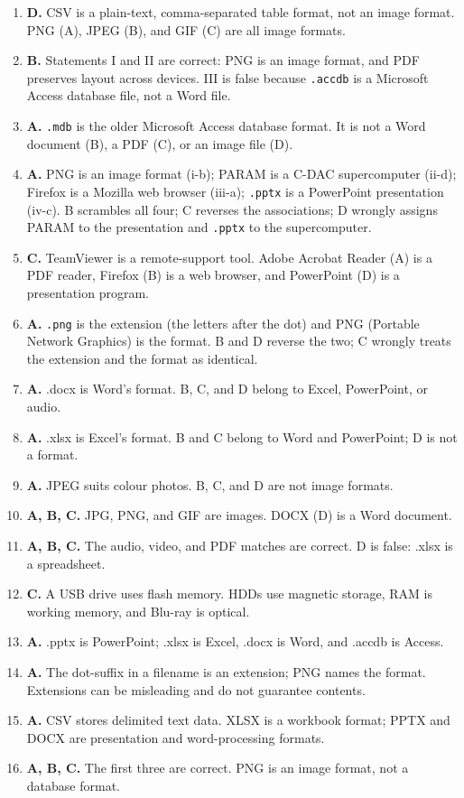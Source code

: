 \begin{enumerate}[label=\textbf{Q\arabic*.}, leftmargin=*]
  separators. It is not a compressed page image (B), a keyed database (C), or
  a formatted document (D).
\item \textbf{D.} CSV is a plain-text, comma-separated table format, not an
  image format. PNG (A), JPEG (B), and GIF (C) are all image formats.
\item \textbf{B.} Statements I and II are correct: PNG is an image format,
  and PDF preserves layout across devices. III is false because
  \texttt{.accdb} is a Microsoft Access database file, not a Word file.
\item \textbf{A.} \texttt{.mdb} is the older Microsoft Access database
  format. It is not a Word document (B), a PDF (C), or an image file (D).
\item \textbf{A.} PNG is an image format (i-b); PARAM is a C-DAC supercomputer
  (ii-d); Firefox is a Mozilla web browser (iii-a); \texttt{.pptx} is a
  PowerPoint presentation (iv-c). B scrambles all four; C reverses the
  associations; D wrongly assigns PARAM to the presentation and
  \texttt{.pptx} to the supercomputer.
\item \textbf{C.} TeamViewer is a remote-support tool. Adobe Acrobat Reader
  (A) is a PDF reader, Firefox (B) is a web browser, and PowerPoint (D) is a
  presentation program.
\item \textbf{A.} \texttt{.png} is the extension (the letters after the dot)
  and PNG (Portable Network Graphics) is the format. B and D reverse the two;
  C wrongly treats the extension and the format as identical.

\item \textbf{A.} .docx is Word's format. B, C, and D belong to Excel, PowerPoint, or audio.
\item \textbf{A.} .xlsx is Excel's format. B and C belong to Word and PowerPoint; D is not a format.
\item \textbf{A.} JPEG suits colour photos. B, C, and D are not image formats.
\item \textbf{A, B, C.} JPG, PNG, and GIF are images. DOCX (D) is a Word document.
\item \textbf{A, B, C.} The audio, video, and PDF matches are correct. D is false: .xlsx is a spreadsheet.
\item \textbf{C.} A USB drive uses flash memory. HDDs use magnetic storage, RAM is working memory, and Blu-ray is optical.

\item \textbf{A.} .pptx is PowerPoint; .xlsx is Excel, .docx is Word, and .accdb is Access.

\item \textbf{A.} The dot-suffix in a filename is an extension; PNG names the format. Extensions can be misleading and do not guarantee contents.

\item \textbf{A.} CSV stores delimited text data. XLSX is a workbook format; PPTX and DOCX are presentation and word-processing formats.

\item \textbf{A, B, C.} The first three are correct. PNG is an image format, not a database format.

\end{enumerate}
